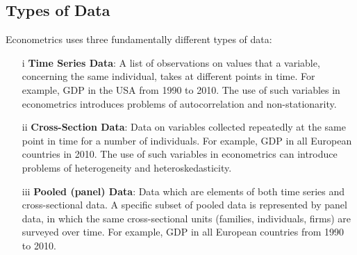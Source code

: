 \subsection{Types of Data}
Econometrics uses three fundamentally different types of data:
\begin{itemize}
    \item [i] \textbf{Time Series Data}: A list of observations on values that a variable, concerning the same individual, takes at different points in time. For example, GDP in the USA from 1990 to 2010. The use of such variables in econometrics introduces problems of autocorrelation and non-stationarity.
    \item [ii] \textbf{Cross-Section Data}: Data on variables collected repeatedly at the same point in time for a number of individuals. For example, GDP in all European countries in 2010. The use of such variables in econometrics can introduce problems of heterogeneity and heteroskedasticity.
    \item [iii] \textbf{Pooled (panel) Data}: Data which are elements of both time series and cross-sectional data. A specific subset of pooled data is represented by panel data, in which the same cross-sectional units (families, individuals, firms) are surveyed over time. For example, GDP in all European countries from 1990 to 2010.
\end{itemize}